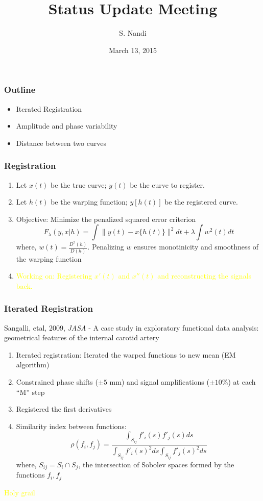 \documentclass[10pt,dvipsnames,table]{beamer}
\title[Status Update Mar '15]{Status Update Meeting}
\author{S. Nandi}
\institute[LMCG]{LMCG \\
 University of Wisconsin-Madison}
\date{March 13, 2015}
\begin{document}
\setlength{\baselineskip}{16truept}
\frame{\maketitle}

\begin{frame}
\frametitle{Outline}
\begin{itemize}
\item Iterated Registration
\item Amplitude and phase variability
\item Distance between two curves
\end{itemize}
\end{frame}

\begin{frame}
\frametitle{Registration}
\begin{enumerate}
\item Let $x(t)$ be the true curve; $y(t)$ be the curve to register. 
\item Let $h(t)$ be the warping function; $y[h(t)]$ be the registered curve.
\item Objective: Minimize the penalized squared error criterion
\[ F_{\lambda}(y, x|h) = \int \| y(t) - x\{h(t)\} \| ^2 dt + \lambda \int w^2 (t)dt \]
where, $w(t) = \frac{D^2(h)}{D(h)}$. Penalizing $w$ ensures monotinicity and smoothness of the warping function
\item \textcolor{yellow}{Working on: Registering $x'(t)$ and $x''(t)$ and reconstructing the signals back.}
\end{enumerate}
\end{frame}

\begin{frame}
\frametitle{Iterated Registration}
Sangalli, etal, 2009, {\emph{JASA}} - A case study in exploratory functional data analysis: geometrical features of the internal carotid artery
\begin{enumerate}
\pause \item Iterated registration: Iterated the warped functions to new mean (EM algorithm)
\pause \item Constrained phase shifts ($\pm 5$ mm) and signal amplifications ($\pm 10\%$) at each ``M'' step
\pause \item Registered the first derivatives
\pause \item Similarity index between functions:
\[ \rho(f_i, f_j) = \frac{\int _{S_{ij}}f'_i(s)f'_j(s) ds}{\int _{S_{ij}}f'_i(s)^2 ds \int _{S_{ij}}f'_j(s)^2 ds} \]
where, $S_{ij} = S_i \cap S_j$, the intersection of Sobolev spaces formed by the functions $f_i, f_j$
\end{enumerate}
\pause
\begin{center}
\textcolor{yellow}{Holy grail}
\end{center}
\end{frame}
\end{document}

